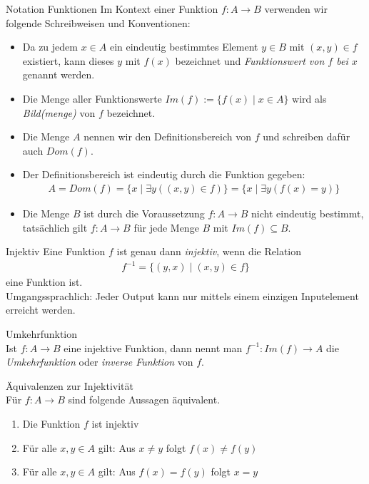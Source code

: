 \begin{concept}{Notation Funktionen}
    Im Kontext einer Funktion $f:A\to B$ verwenden wir folgende Schreibweisen und Konventionen:
    \begin{itemize}
        \item Da zu jedem $x\in A$ ein eindeutig bestimmtes Element $y\in B$ mit $(x,y)\in f$ existiert, kann dieses $y$ mit $f(x)$ bezeichnet und \textit{Funktionswert von $f$ bei $x$} genannt werden.
        \item Die Menge aller Funktionswerte $Im(f) := \{f(x)\mid x\in A \}$ wird als \textit{Bild(menge)} von $f$ bezeichnet.
        \item Die Menge $A$ nennen wir den Definitionsbereich von $f$ und schreiben dafür auch $Dom(f)$.
        \item Der Definitionsbereich ist eindeutig durch die Funktion gegeben:
            \begin{align*}
                A=Dom(f)=\{x\mid \exists y ((x,y)\in f) \}=\{x\mid \exists y (f(x)=y )\}
            \end{align*}
        \item Die Menge $B$ ist durch die Voraussetzung $f:A\to B$ nicht eindeutig bestimmt, tatsächlich gilt $f:A\to B$ für jede Menge $B$ mit $Im(f)\subseteq B$.
    \end{itemize}
\end{concept}

\begin{definition}{Injektiv}
    Eine Funktion $f$ ist genau dann \textit{injektiv}, wenn die Relation
    \begin{align*}
        f^{-1}=\{(y,x)\mid (x,y)\in f\}
    \end{align*}
    eine Funktion ist.\\
    Umgangssprachlich: Jeder Output kann nur mittels einem einzigen Inputelement erreicht werden.
\end{definition}

\begin{definition}{Umkehrfunktion}\\
    Ist $f:A\to B$ eine injektive Funktion, dann nennt man $f^{-1}:Im(f)\to A$ die \textit{Umkehrfunktion} oder \textit{inverse Funktion} von $f$.
\end{definition}

\begin{lemma}{Äquivalenzen zur Injektivität}\\
    Für $f:A \to B$ sind folgende Aussagen äquivalent.
    \begin{enumerate}
        \item Die Funktion $f$ ist injektiv
        \item Für alle $x,y\in A$ gilt: Aus $x\neq y$ folgt $f(x)\neq f(y)$
        \item Für alle $x,y\in A$ gilt: Aus $f(x)=f(y)$ folgt $x=y$
    \end{enumerate}
\end{lemma}

